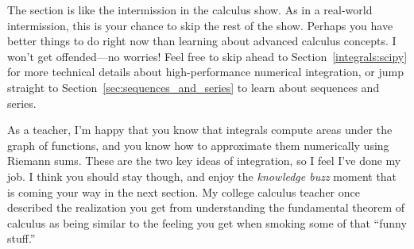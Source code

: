 		The section is like the intermission in the calculus show.
		As in a real-world intermission,
		this is your chance to skip the rest of the show.
		Perhaps you have better things to do right now than learning about advanced calculus concepts.
		I won't get offended---no worries!
		Feel free to skip ahead to Section~\ref{integrals:scipy}
		for more technical details about high-performance numerical integration,
		or jump straight to Section~\ref{sec:sequences_and_series} to learn about sequences and series.

		As a teacher,
		I'm happy that you know
		that integrals compute areas under the graph of functions,
		and you know how to  approximate them numerically using Riemann sums.
		These are the two key ideas of integration,
		so I feel I've done my job.
		I think you should stay though,
		and enjoy the \emph{knowledge buzz} moment
		that is coming your way in the next section.
		My college calculus teacher
		once described the realization you get from understanding the fundamental theorem of calculus
		as being similar to the feeling you get when smoking some of that ``funny stuff.''







